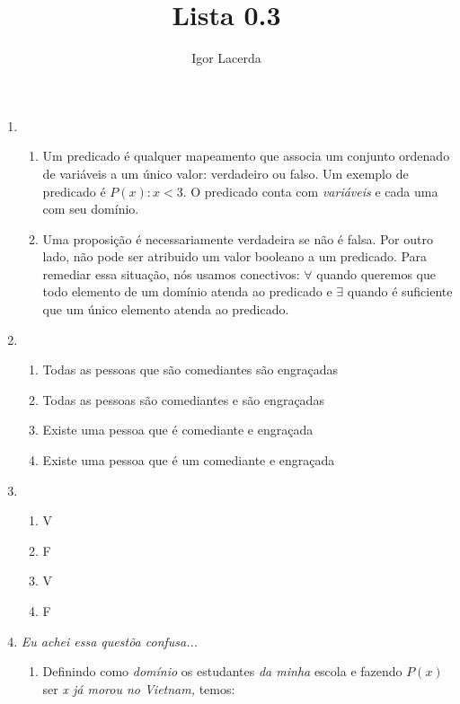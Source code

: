 \documentclass{article}
\title{Lista 0.3}
\author{Igor Lacerda}
\begin{document}
\maketitle
\begin{enumerate}
    \item 
        \begin{enumerate}
            \item Um predicado é qualquer mapeamento que associa um conjunto ordenado de variáveis a um único valor: verdadeiro ou falso. Um exemplo de predicado é \(P(x): x < 3 \). O predicado conta com \textit{variáveis} e cada uma com seu domínio.

            \item Uma proposição é necessariamente verdadeira se não é falsa. Por outro lado, não pode ser atribuido um valor booleano a um predicado. Para remediar essa situação, nós usamos conectivos: \( \forall \) quando queremos que todo elemento de um domínio atenda ao predicado e \( \exists \) quando é suficiente que um único elemento atenda ao predicado.
        \end{enumerate}

    \item 
        \begin{enumerate}
            \item Todas as pessoas que são comediantes são engraçadas

            \item Todas as pessoas são comediantes e são engraçadas

            \item Existe uma pessoa que é comediante e engraçada

            \item Existe uma pessoa que é um comediante e engraçada
        \end{enumerate}

    \item 
        \begin{enumerate}
            \item V
            \item F
            \item V
            \item F
        \end{enumerate}

    \item \textit{Eu achei essa questõa confusa...}

        \begin{enumerate}
            \item Definindo como \textit{domínio} os estudantes \textit{da minha}  escola e fazendo \( P(x) \) ser \textit{x já morou no Vietnam,} temos:


\end{enumerate}
\end{enumerate}
\end{document}
